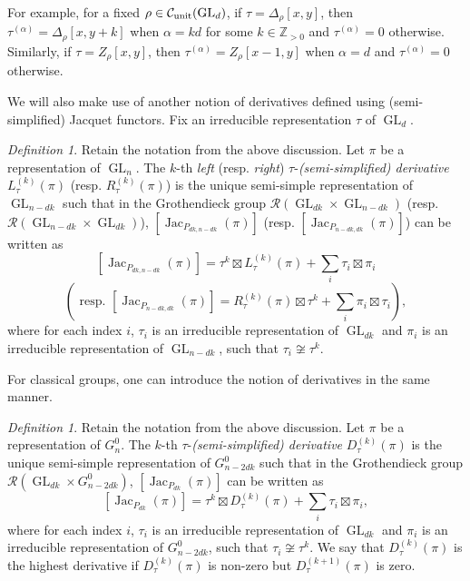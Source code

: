 \documentclass[11pt,letterpaper]{amsart}
\theoremstyle{plain}
\newcounter{theorem}[section]
\numberwithin{theorem}{section}
\numberwithin{equation}{subsection}
\theoremstyle{remark}
\newtheorem{Def}[theorem]{Definition}
\newcommand{\GL}{\operatorname{GL}}
\newcommand{\Jac}{\operatorname{Jac}}
\newcommand{\Z}{\mathbb{Z}}
\newcommand{\unit}{{\rm unit}}
\def\calC{\mathcal{C}}
\def\calR{\mathcal{R}}
\begin{document}
\vskip 5pt

For example, for a fixed $\rho\in\calC_{\unit}(\GL_d)$, if $\tau = \Delta_\rho[x,y]$, then $\tau^{(\alpha)}=\Delta_\rho[x,y+k]$ when $\alpha=kd$ for some $k\in\Z_{>0}$ and $\tau^{(\alpha)}=0$ otherwise. Similarly, if $\tau = Z_\rho[x,y]$, then $\tau^{(\alpha)}=Z_\rho[x-1,y]$ when $\alpha=d$ and $\tau^{(\alpha)}=0$ otherwise. 

\vskip 5pt

We will also make use of another notion of derivatives defined using (semi-simplified) Jacquet functors. Fix an irreducible representation $\tau$ of $\GL_d$.

\begin{Def}
Retain the notation from the above discussion. Let $\pi$ be a representation of $\GL_n$. The \(k\)-th \emph{left} (resp. \emph{right}) \(\tau\)-\emph{(semi-simplified) derivative} \(L^{(k)}_{\tau}(\pi)\) (resp. \(R^{(k)}_{\tau}(\pi)\)) is the unique semi-simple representation of \(\GL_{n-dk}\) such that in the Grothendieck group $\calR(\GL_{dk}\times\GL_{n-dk})$ (resp. $\calR(\GL_{n-dk}\times\GL_{dk})$), $\left[\Jac_{P_{dk,n-dk}}(\pi)\right]$ (resp. $\left[\Jac_{P_{n-dk,dk}}(\pi)\right]$) can be written as
\[
    \left[\Jac_{P_{dk,n-dk}}(\pi)\right] = \tau^k\boxtimes L^{(k)}_{\tau}(\pi)+ \sum_{i}\tau_i\boxtimes\pi_i
\]
\[
    \left(\text{ resp. } \left[\Jac_{P_{n-dk,dk}}(\pi)\right] = R^{(k)}_{\tau}(\pi)\boxtimes\tau^k + \sum_{i}\pi_i\boxtimes\tau_i\right),
\]
where for each index $i$, $\tau_i$ is an irreducible representation of $\GL_{dk}$ and $\pi_i$ is an irreducible representation of $\GL_{n-dk}$, such that \(\tau_i\not\cong\tau^k\).
\end{Def} 

\vskip 5pt

For classical groups, one can introduce the notion of derivatives in the same manner.

\begin{Def}
Retain the notation from the above discussion. Let $\pi$ be a representation of $G^0_n$. The \(k\)-th \(\tau\)-\emph{(semi-simplified) derivative} \(D^{(k)}_{\tau}(\pi)\) is the unique semi-simple representation of \(G^0_{n-2dk}\) such that in the Grothendieck group $\calR(\GL_{dk}\times G^0_{n-2dk})$, $\left[\Jac_{P_{dk}}(\pi)\right]$ can be written as
\[
    \left[\Jac_{P_{dk}}(\pi)\right]= \tau^k\boxtimes D^{(k)}_{\tau}(\pi) + \sum_i\tau_i\boxtimes\pi_i,
\]
where for each index $i$, $\tau_i$ is an irreducible representation of $\GL_{dk}$ and $\pi_i$ is an irreducible representation of $G^0_{n-2dk}$, such that \(\tau_i\not\cong\tau^k\). We say that \(D^{(k)}_{\tau}(\pi)\) is the highest derivative if \(D^{(k)}_{\tau}(\pi)\) is non-zero but \(D^{(k+1)}_{\tau}(\pi)\) is zero.
\end{Def}
\end{document}
